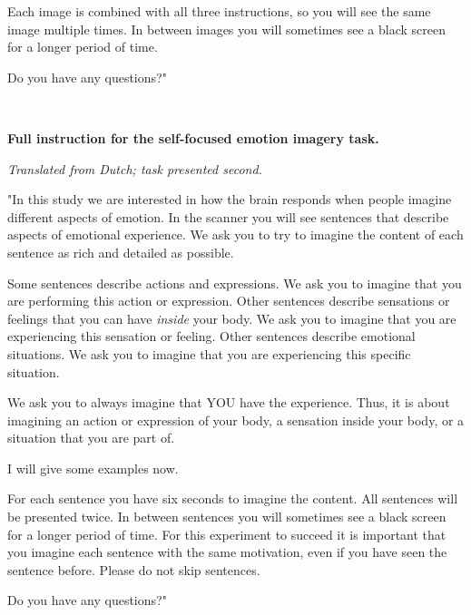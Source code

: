 \documentclass[12pt,american,a4paper,oneside,]{memoir} %
\begin{document}
Each image is combined with all three instructions, so you will see the same image multiple times. In between images you will sometimes see a black screen for a longer period of time.

Do you have any questions?"

~
~

\textbf{Full instruction for the self-focused emotion imagery task.}

\emph{Translated from Dutch; task presented second.}

"In this study we are interested in how the brain responds when people imagine different aspects of emotion. In the scanner you will see sentences that describe aspects of emotional experience. We ask you to try to imagine the content of each sentence as rich and detailed as possible.

Some sentences describe actions and expressions. We ask you to imagine that you are performing this action or expression. Other sentences describe sensations or feelings that you can have \emph{inside} your body. We ask you to imagine that you are experiencing this sensation or feeling. Other sentences describe emotional situations. We ask you to imagine that you are experiencing this specific situation.

We ask you to always imagine that YOU have the experience. Thus, it is about imagining an action or expression of your body, a sensation inside your body, or a situation that you are part of.

I will give some examples now.

For each sentence you have six seconds to imagine the content. All sentences will be presented twice. In between sentences you will sometimes see a black screen for a longer period of time. For this experiment to succeed it is important that you imagine each sentence with the same motivation, even if you have seen the sentence before. Please do not skip sentences.

Do you have any questions?"
\end{document}
